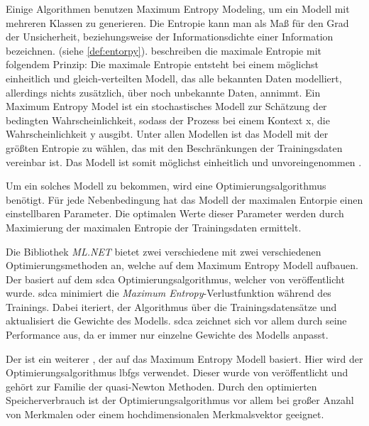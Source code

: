 \label{c:conception:classification:multiclass:maximum-entropy}
Einige Algorithmen benutzen Maximum Entropy Modeling, um ein Modell mit mehreren Klassen zu generieren. Die Entropie kann man als Maß für den Grad der Unsicherheit, beziehungsweise der Informationsdichte einer Information bezeichnen. (siehe \autoref{def:entorpy}). \cite{maximumentorpy1996} beschreiben die maximale Entropie mit folgendem Prinzip: Die maximale Entropie entsteht bei einem möglichst einheitlich und gleich-verteilten Modell, das alle bekannten Daten modelliert, allerdings nichts zusätzlich, über noch unbekannte Daten, annimmt. Ein Maximum Entropy Model ist ein stochastisches Modell zur Schätzung der bedingten Wahrscheinlichkeit, sodass der Prozess bei einem Kontext x, die Wahrscheinlichkeit y ausgibt. Unter allen Modellen ist das Modell mit der größten Entropie zu wählen, das mit den Beschränkungen der Trainingsdaten vereinbar ist. Das Modell ist somit möglichst einheitlich und unvoreingenommen \citep[vgl.][]{maximumentorpy1996}.

Um ein solches Modell zu bekommen, wird eine Optimierungsalgorithmus benötigt.
Für jede Nebenbedingung hat das Modell der maximalen Entorpie einen einstellbaren Parameter. Die optimalen Werte dieser Parameter werden durch Maximierung der maximalen Entropie der Trainingsdaten ermittelt. \citep[vgl.][]{maximumentorpy1996}

Die Bibliothek \textit{ML.NET} bietet zwei verschiedene  mit zwei verschiedenen Optimierungsmethoden an, welche auf dem Maximum Entropy Modell aufbauen.
Der  basiert auf dem 
\ac{sdca} Optimierungsalgorithmus, welcher von \cite{shalevshwartz2013stochastic} veröffentlicht wurde. \ac{sdca} minimiert die \textit{Maximum Entropy}-Verlustfunktion während des Trainings. Dabei iteriert, der Algorithmus über die Trainingsdatensätze und aktualisiert die Gewichte des Modells. \ac{sdca} zeichnet sich vor allem durch seine Performance aus, da er immer nur einzelne Gewichte des Modells anpasst. \citep[vgl.][]{shalevshwartz2013stochastic,sdcatrainer_doc2022}

Der  ist ein weiterer , der auf das Maximum Entropy Modell basiert. Hier wird der Optimierungsalgorithmus \ac{lbfgs} verwendet. Dieser wurde \citeyear{Liu1989OnTL} von \citeauthor{Liu1989OnTL} veröffentlicht und gehört zur Familie der quasi-Newton Methoden. Durch den optimierten Speicherverbrauch ist der Optimierungsalgorithmus vor allem bei großer Anzahl von Merkmalen oder einem hochdimensionalen Merkmalsvektor geeignet. \citep[vgl.][]{lbfgstrainer_doc2022}

